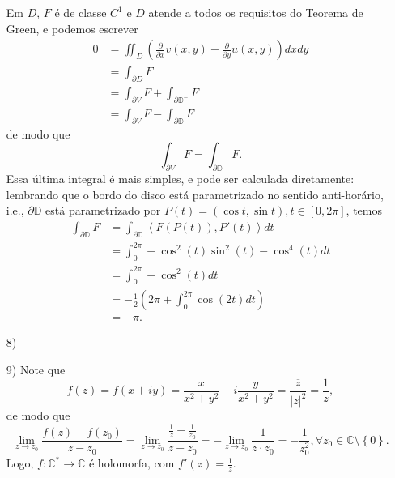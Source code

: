 \documentclass[12pt,a4paper]{article}
\begin{document}
\begin{enumerate}
\begin{figure}[h!]
	\end{figure}
	\par Em $D$, $F$ é de classe $C^1$ e $D$ atende a todos os requisitos do Teorema de Green, e podemos escrever
	\begin{align*}
	0 &= \iint_D \left( \frac{\partial}{\partial x}v(x,y) - \frac{\partial}{\partial y}u(x,y) \right)dxdy \\
	&= \int_{\partial D} F \\
	&= \int_{\partial V} F + \int_{\partial\mathbb{D}^{-}}F \\
	&= \int_{\partial V} F - \int_{\partial\mathbb{D}}F 
	\end{align*}
	de modo que
	$$
	\int_{\partial V} F = \int_{\partial\mathbb{D}}F.
	$$
	Essa última integral é mais simples, e pode ser calculada diretamente: lembrando que o bordo do disco está parametrizado no sentido anti-horário, i.e., $\partial\mathbb{D}$ está parametrizado por $P(t) = (\cos t, \sin t), t\in[0,2\pi]$, temos
	\begin{align*}
	\int_{\partial\mathbb{D}}F &= \int_{\partial\mathbb{D}} \left\langle F(P(t)), P'(t) \right\rangle dt \\
	&= \int_{0}^{2\pi} -\cos^2(t)\sin^2(t) - \cos^4(t) dt \\
	&= \int_{0}^{2\pi} -\cos^2(t)dt \\
	&= -\frac{1}{2}\left( 2\pi + \int_{0}^{2\pi}\cos(2t)dt \right) \\
	&= -\pi. 
	\end{align*}
	
	\item[8)]
	
	\item[9)] Note que
	$$
	f(z) = f(x+iy) = \frac{x}{x^2+y^2} - i\frac{y}{x^2+y^2} = \frac{\overline{z}}{|z|^2} = \frac{1}{z},
	$$
	de modo que
	$$
	\lim\limits_{z\to z_0} \frac{f(z) - f(z_0)}{z - z_0} = \lim\limits_{z\to z_0} \frac{\frac{1}{z} - \frac{1}{z_0}}{z - z_0} = -\lim\limits_{z\to z_0} \frac{1}{z\cdot z_0} = -\frac{1}{z_0^2}, \forall z_0\in\mathbb{C}\setminus\left\{0\right\}.
	$$
	Logo, $f:\mathbb{C}^*\to\mathbb{C}$ é holomorfa, com $\displaystyle{f'(z) = \frac{1}{z}}$.
	

\end{enumerate}
\end{document}
